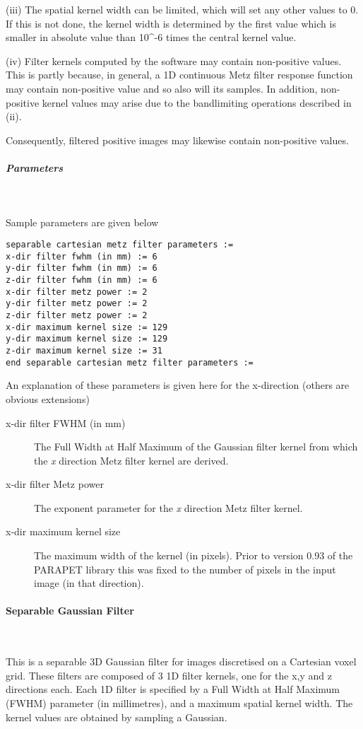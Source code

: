 \documentclass{article}
\newcommand{\subsubsubsection}[1]{\paragraph{#1}\mbox{} \\}
\newcommand{\subsubsubsubsection}[1]{\subparagraph{#1} \mbox{} \\}
\begin{document}
{{{(iii) The spatial kernel width can be limited, which will set 
any other values to 0. If this is not done, the kernel width 
is determined by the first value which is smaller in absolute 
value than 10{\textasciicircum}-6 times the central kernel value.



(iv) Filter kernels computed by the software may contain non-positive 
values. This is partly because, in general, a 1D continuous Metz 
filter response function may contain non-positive value and so 
also will its samples. In addition, non-positive kernel values 
may arise due to the bandlimiting operations described in (ii). 



Consequently, filtered positive images may likewise contain non-positive 
values. 

{ \subsubsubsubsection{Parameters}
}
Sample parameters are given below
\begin{verbatim}
separable cartesian metz filter parameters :=
x-dir filter fwhm (in mm) := 6
y-dir filter fwhm (in mm) := 6
z-dir filter fwhm (in mm) := 6
x-dir filter metz power := 2
y-dir filter metz power := 2
z-dir filter metz power := 2
x-dir maximum kernel size := 129
y-dir maximum kernel size := 129
z-dir maximum kernel size := 31
end separable cartesian metz filter parameters := 
\end{verbatim}


An explanation of these parameters is given here for the x-direction 
(others are obvious extensions)
\begin{description}
\item[x-dir filter FWHM (in mm)]
The Full Width at Half Maximum of the Gaussian filter kernel 
from which the \textit{x} direction Metz filter kernel are derived.

\item[x-dir filter Metz power]
The exponent parameter for the \textit{x} direction Metz filter kernel.

\item[x-dir maximum kernel size]
The maximum width of the kernel (in pixels). Prior to version 
0.93 of the PARAPET library this was fixed to the number of pixels 
in the input image (in that direction).
\end{description}

{ \subsubsubsection{Separable Gaussian Filter}
}
This is a separable 3D Gaussian filter for images discretised on
a Cartesian voxel grid. These filters are composed of 3 1D filter
kernels, one for the x,y and z directions each. Each 1D filter
is specified by a Full Width at Half Maximum (FWHM) parameter
(in millimetres), and a maximum spatial kernel width.
The kernel values are obtained by sampling a Gaussian.

}}}
\end{document}

